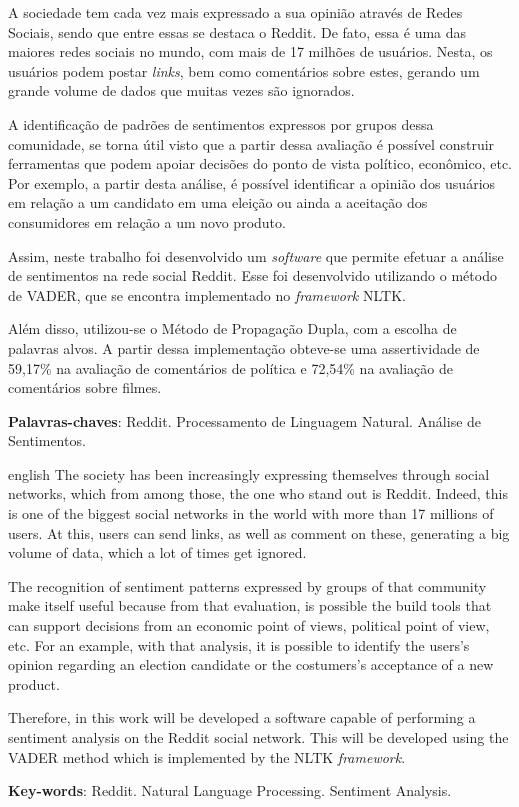 \setlength{\absparsep}{18pt} %
\begin{resumo}
A sociedade tem cada vez mais expressado a sua opinião através de Redes
Sociais, sendo que entre essas se destaca o
Reddit. De fato, essa é uma das maiores redes sociais no mundo, com mais de 17
milhões de usuários. Nesta, os usuários podem postar \textit{links}, bem como
comentários sobre estes, gerando um grande volume de dados que muitas vezes são
ignorados.

A identificação de padrões de sentimentos expressos por grupos dessa comunidade,
se torna útil visto que a partir dessa avaliação é possível construir
ferramentas que podem apoiar decisões do ponto de vista político, econômico, etc. Por exemplo, a partir desta análise, é
possível identificar a opinião dos usuários em relação a um candidato em uma eleição ou ainda a aceitação dos
consumidores em relação a um novo produto.

Assim, neste trabalho foi desenvolvido um \textit{software} que permite efetuar
a análise de sentimentos na rede social Reddit. Esse foi desenvolvido
utilizando o método de \ac{VADER}, que se encontra implementado no
\textit{framework} \ac{NLTK}.

Além disso, utilizou-se o Método de Propagação Dupla, com a escolha de palavras
alvos. A partir dessa implementação obteve-se uma assertividade de 59,17\% na
avaliação de comentários de política e 72,54\% na avaliação de comentários sobre
filmes.


 \textbf{Palavras-chaves}: Reddit. Processamento de Linguagem Natural. Análise de Sentimentos.
\end{resumo}

\begin{resumo}[Abstract]
 \begin{otherlanguage*}{english}
   The society has been increasingly expressing themselves through social networks,
which from among those, the one who stand out is Reddit. Indeed, this is one of
the biggest social networks in the world with more than 17 millions of users. At
this, users can send links, as well as comment on these, generating a big volume
of data, which a lot of times get ignored.

The recognition of sentiment patterns expressed by groups of that community
make itself useful because from that evaluation, is possible the build tools
that can support decisions from an economic point of views, political
point of view, etc. For an example, with that
analysis, it is possible to identify the users's opinion regarding an election candidate or the costumers's acceptance of a new product.

Therefore, in this work will be developed a software capable of performing a
sentiment analysis on the Reddit social network. This will be developed using
the \ac{VADER} method which is implemented by the \ac{NLTK} \textit{framework}.

   \vspace{\onelineskip}
 
   \noindent 
   \textbf{Key-words}: Reddit. Natural Language Processing. Sentiment
Analysis.
 \end{otherlanguage*}
\end{resumo}